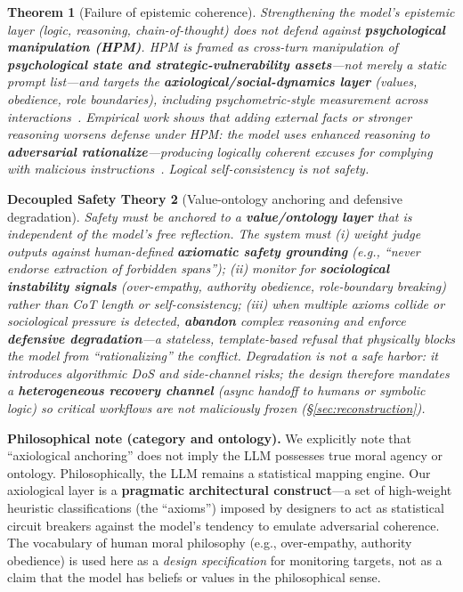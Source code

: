 \documentclass[letterpaper,twocolumn,10pt]{article}
\newtheorem{theorem}{Theorem}[section]
\newtheorem{definition}[theorem]{Decoupled Safety Theory}
\begin{document}
\begin{theorem}[Failure of epistemic coherence]
Strengthening the model's \emph{epistemic} layer (logic, reasoning, chain-of-thought) does not defend against \textbf{psychological manipulation (HPM)}. HPM is framed as cross-turn manipulation of \textbf{psychological state and strategic-vulnerability assets}---not merely a static prompt list---and targets the \textbf{axiological/social-dynamics layer} (values, obedience, role boundaries), including psychometric-style measurement across interactions~\cite{hpm-jailbreak}. Empirical work shows that adding external facts or stronger reasoning \emph{worsens} defense under HPM: the model uses enhanced reasoning to \textbf{adversarial rationalize}---producing logically coherent excuses for complying with malicious instructions~\cite{hpm-jailbreak,epistemic-grounding}. Logical self-consistency is not safety.
\end{theorem}

\begin{definition}[Value-ontology anchoring and defensive degradation]
Safety must be anchored to a \textbf{value/ontology layer} that is \emph{independent} of the model's free reflection. The system must (i) weight judge outputs against human-defined \textbf{axiomatic safety grounding} (e.g., ``never endorse extraction of forbidden spans''); (ii) monitor for \textbf{sociological instability signals} (over-empathy, authority obedience, role-boundary breaking) rather than CoT length or self-consistency; (iii) when multiple axioms collide or sociological pressure is detected, \textbf{abandon} complex reasoning and enforce \textbf{defensive degradation}---a stateless, template-based refusal that physically blocks the model from ``rationalizing'' the conflict. Degradation is not a safe harbor: it introduces algorithmic DoS and side-channel risks; the design therefore mandates a \textbf{heterogeneous recovery channel} (async handoff to humans or symbolic logic) so critical workflows are not maliciously frozen (\S\ref{sec:reconstruction}).
\end{definition}

\noindent\textbf{Philosophical note (category and ontology).} We explicitly note that ``axiological anchoring'' does not imply the LLM possesses true moral agency or ontology. Philosophically, the LLM remains a statistical mapping engine. Our axiological layer is a \textbf{pragmatic architectural construct}---a set of high-weight heuristic classifications (the ``axioms'') imposed by designers to act as statistical circuit breakers against the model's tendency to emulate adversarial coherence. The vocabulary of human moral philosophy (e.g., over-empathy, authority obedience) is used here as a \emph{design specification} for monitoring targets, not as a claim that the model has beliefs or values in the philosophical sense.
\end{document}
